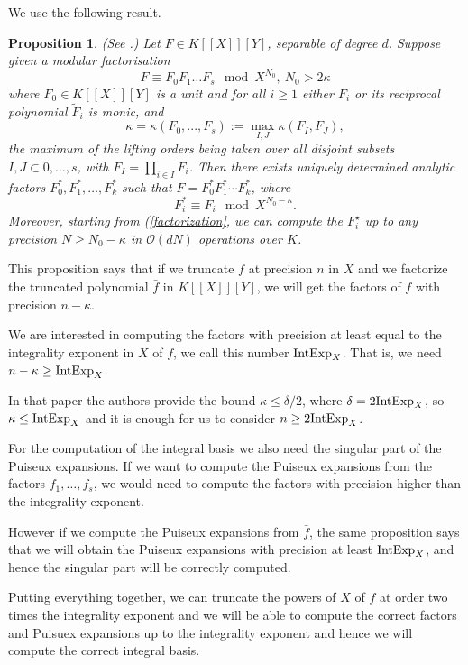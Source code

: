 \documentclass[a4paper,11pt]{amsart}%
\theoremstyle{definition}
\theoremstyle{plain}
\newtheorem{proposition}[defn]{Proposition}
\theoremstyle{remark}
\newcommand{\bigO}{\mathcal{O}}
\newcommand\ct[1]{\text{\rmfamily\upshape #1}}
\newcommand{\IntExpX}{\ct{IntExp}_X}
\begin{document}
We use the following result.

\begin{proposition}\label{prop:factors}(See \cite[Proposition 23]{poteaux2021}.)
Let $F \in K[[X]][Y]$, separable of degree $d$. Suppose given a modular factorisation
\begin{equation}\label{factorization}
F \equiv  F_0 F_1 \dots F_s \mod X^{N_0}, \ N_0 > 2\kappa
\end{equation}
where $F_0 \in K[[X]][Y]$ is a unit and for all $i \ge 1$ either $F_i$ or its reciprocal polynomial $\tilde F_i$ is monic, and
$$
\kappa = \kappa(F_0,..., F_s) := \max_{I, J} \kappa(F_I, F_J),
$$
the maximum of the lifting orders being taken over all disjoint subsets $I, J \subset {0,\dots,s}$,
with $F_I = \prod_{i\in I} F_i$. Then there exists uniquely determined analytic factors $F_0^*, F_1^*,\dots, F_k^*$ such that $F = F_0^* F_1^* \cdots F_k^*$, where
$$
F_i^* \equiv F_i \mod X^{N_0−\kappa}.
$$
Moreover, starting from (\ref{factorization}, we can compute the $F_i^\star$ up to any precision $N \ge N_0 − \kappa$ in $\bigO(dN)$ operations over $K$.
\end{proposition}

This proposition says that if we truncate $f$ at precision $n$ in $X$ and we factorize the truncated polynomial $\bar f$ in $K[[X]][Y]$, we will get the factors of $f$ with precision $n - \kappa$.

We are interested in computing the factors with precision at least equal to the integrality exponent in $X$ of $f$, we call this number $\IntExpX$. That is, we need
$n - \kappa \ge \IntExpX$.

In that paper the authors provide the bound $\kappa \le \delta / 2$, where $\delta = 2 \IntExpX$, so $\kappa \le \IntExpX$ and it is enough for us to consider $n \ge 2 \IntExpX$.

For the computation of the integral basis we also need the singular part of the Puiseux expansions. If we want to compute the Puiseux expansions from the factors $f_1, \dots, f_s$, we would need to compute the factors with precision higher than the integrality exponent.

However if we compute the Puiseux expansions from $\bar f$, the same proposition says that we will obtain the Puiseux expansions with precision at least $\IntExpX$, and hence the singular part will be correctly computed.

Putting everything together, we can truncate the powers of $X$ of $f$ at order two times the integrality exponent and we will be able to compute the correct factors and Puisuex expansions up to the integrality exponent and hence we will compute the correct integral basis.
\end{document}
